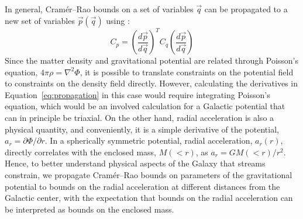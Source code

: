 \documentclass[modern]{aastex62}
\begin{document}
In general, Cram\'er--Rao bounds on a set of variables $\vec{q}$ can be propagated to a new set of variables $\vec{p}(\vec{q})$ using \citep{albrecht2009}:
\begin{equation}
C_p = \left(\frac{d\vec{p}}{d\vec{q}}\right)^{T} C_q \left(\frac{d\vec{p}}{d\vec{q}}\right)
\label{eq:propagation}
\end{equation}
Since the matter density and gravitational potential are related through Poisson's equation, $4\pi\rho = \nabla^2\Phi$, it is possible to translate constraints on the potential field to constraints on the density field directly.
However, calculating the derivatives in Equation~\ref{eq:propagation} in this case would require integrating Poisson's equation, which would be an involved calculation for a Galactic potential that can in principle be triaxial.
On the other hand, radial acceleration is also a physical quantity, and conveniently, it is a simple derivative of the potential, $a_r = \partial\Phi / \partial r$.
In a spherically symmetric potential, radial acceleration, $a_r(r)$, directly correlates with the enclosed mass, $M(<r)$, as $a_r = G M(<r)/r^2$.
Hence, to better understand physical aspects of the Galaxy that streams constrain, we propagate Cram\'er--Rao bounds on parameters of the gravitational potential to bounds on the radial acceleration at different distances from the Galactic center, with the expectation that bounds on the radial acceleration can be interpreted as bounds on the enclosed mass.
\end{document}
